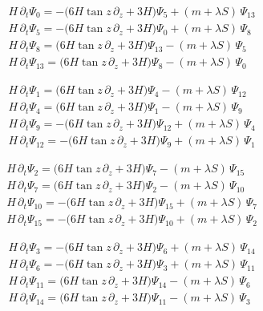 \documentclass[11pt]{article}
\begin{document}
\[
\begin{aligned}
&H\,\partial_{t}\Psi_{0}=-\bigl(6H\tan z\,\partial_{z}+3H\bigr)\Psi_{5}+(m+\lambda S)\,\Psi_{13} \\
&H\,\partial_{t}\Psi_{5}=-\bigl(6H\tan z\,\partial_{z}+3H\bigr)\Psi_{0}+(m+\lambda S)\,\Psi_{8} \\
&H\,\partial_{t}\Psi_{8}=\bigl(6H\tan z\,\partial_{z}+3H\bigr)\Psi_{13}-(m+\lambda S)\,\Psi_{5} \\
&H\,\partial_{t}\Psi_{13}=\bigl(6H\tan z\,\partial_{z}+3H\bigr)\Psi_{8}-(m+\lambda S)\,\Psi_{0}
\end{aligned}\tag{block 0,5,8,13}
\]

\[
\begin{aligned}
&H\,\partial_{t}\Psi_{1}=\bigl(6H\tan z\,\partial_{z}+3H\bigr)\Psi_{4}-(m+\lambda S)\,\Psi_{12} \\
&H\,\partial_{t}\Psi_{4}=\bigl(6H\tan z\,\partial_{z}+3H\bigr)\Psi_{1}-(m+\lambda S)\,\Psi_{9} \\
&H\,\partial_{t}\Psi_{9}=-\bigl(6H\tan z\,\partial_{z}+3H\bigr)\Psi_{12}+(m+\lambda S)\,\Psi_{4} \\
&H\,\partial_{t}\Psi_{12}=-\bigl(6H\tan z\,\partial_{z}+3H\bigr)\Psi_{9}+(m+\lambda S)\,\Psi_{1}
\end{aligned}\tag{block 1,4,9,12}
\]

\[
\begin{aligned}
&H\,\partial_{t}\Psi_{2}=\bigl(6H\tan z\,\partial_{z}+3H\bigr)\Psi_{7}-(m+\lambda S)\,\Psi_{15} \\
&H\,\partial_{t}\Psi_{7}=\bigl(6H\tan z\,\partial_{z}+3H\bigr)\Psi_{2}-(m+\lambda S)\,\Psi_{10} \\
&H\,\partial_{t}\Psi_{10}=-\bigl(6H\tan z\,\partial_{z}+3H\bigr)\Psi_{15}+(m+\lambda S)\,\Psi_{7} \\
&H\,\partial_{t}\Psi_{15}=-\bigl(6H\tan z\,\partial_{z}+3H\bigr)\Psi_{10}+(m+\lambda S)\,\Psi_{2}
\end{aligned}\tag{block 2,7,10,15}
\]

\[
\begin{aligned}
&H\,\partial_{t}\Psi_{3}=-\bigl(6H\tan z\,\partial_{z}+3H\bigr)\Psi_{6}+(m+\lambda S)\,\Psi_{14} \\
&H\,\partial_{t}\Psi_{6}=-\bigl(6H\tan z\,\partial_{z}+3H\bigr)\Psi_{3}+(m+\lambda S)\,\Psi_{11} \\
&H\,\partial_{t}\Psi_{11}=\bigl(6H\tan z\,\partial_{z}+3H\bigr)\Psi_{14}-(m+\lambda S)\,\Psi_{6} \\
&H\,\partial_{t}\Psi_{14}=\bigl(6H\tan z\,\partial_{z}+3H\bigr)\Psi_{11}-(m+\lambda S)\,\Psi_{3}
\end{aligned}\tag{block 3,6,11,14}
\]
\end{document}
